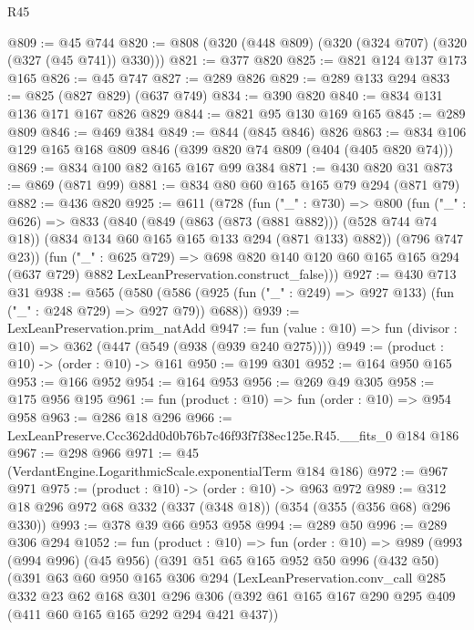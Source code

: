 \begin{lexlean}{R45}
\begin{coremodule}
@809 := @45 @744
@820 := @808 (@320 (@448 @809) (@320 (@324 @707) (@320 (@327 (@45 @741)) @330)))
@821 := @377 @820
@825 := @821 @124 @137 @173 @165
@826 := @45 @747
@827 := @289 @826
@829 := @289 @133 @294
@833 := @825 (@827 @829) (@637 @749)
@834 := @390 @820
@840 := @834 @131 @136 @171 @167 @826 @829
@844 := @821 @95 @130 @169 @165
@845 := @289 @809
@846 := @469 @384
@849 := @844 (@845 @846) @826
@863 := @834 @106 @129 @165 @168 @809 @846 (@399 @820 @74 @809 (@404 (@405 @820 @74)))
@869 := @834 @100 @82 @165 @167 @99 @384
@871 := @430 @820 @31
@873 := @869 (@871 @99)
@881 := @834 @80 @60 @165 @165 @79 @294 (@871 @79)
@882 := @436 @820
@925 := @611
    (@728
      (fun ("_" : @730) =>
      @800
        (fun ("_" : @626) =>
        @833
          (@840
            (@849 (@863 (@873 (@881 @882))) (@528 @744 @74 @18))
            (@834 @134 @60 @165 @165 @133 @294 (@871 @133) @882))
          (@796 @747 @23))
        (fun ("_" : @625 @729) =>
        @698
          @820
          @140
          @120
          @60
          @165
          @165
          @294
          (@637 @729)
          @882
          LexLeanPreservation.construct_false)))
@927 := @430 @713 @31
@938 := @565
    (@580 (@586 (@925 (fun ("_" : @249) => @927 @133) (fun ("_" : @248 @729) => @927 @79)) @688))
@939 := LexLeanPreservation.prim_natAdd
@947 := fun (value : @10) => fun (divisor : @10) => @362 (@447 (@549 (@938 (@939 @240 @275))))
@949 := (product : @10) -> (order : @10) -> @161
@950 := @199 @301
@952 := @164 @950 @165
@953 := @166 @952
@954 := @164 @953
@956 := @269 @49 @305
@958 := @175 @956 @195
@961 := fun (product : @10) => fun (order : @10) => @954 @958
@963 := @286 @18 @296
@966 := LexLeanPreserve.Ccc362dd0d0b76b7c46f93f7f38ec125e.R45.__fits_0 @184 @186
@967 := @298 @966
@971 := @45 (VerdantEngine.LogarithmicScale.exponentialTerm @184 @186)
@972 := @967 @971
@975 := (product : @10) -> (order : @10) -> @963 @972
@989 := @312 @18 @296 @972 @68 @332 (@337 (@348 @18)) (@354 (@355 (@356 @68) @296 @330))
@993 := @378 @39 @66 @953 @958
@994 := @289 @50
@996 := @289 @306 @294
@1052 := fun (product : @10) =>
  fun (order : @10) =>
  @989
    (@993
      (@994 @996)
      (@45 @956)
      (@391
        @51
        @65
        @165
        @952
        @50
        @996
        (@432 @50)
        (@391
          @63
          @60
          @950
          @165
          @306
          @294
          (LexLeanPreservation.conv_call
            @285
            @332
            @23
            @62
            @168
            @301
            @296
            @306
            (@392 @61 @165 @167 @290 @295 @409 (@411 @60 @165 @165 @292 @294 @421 @437))

\end{coremodule}
\end{lexlean}
